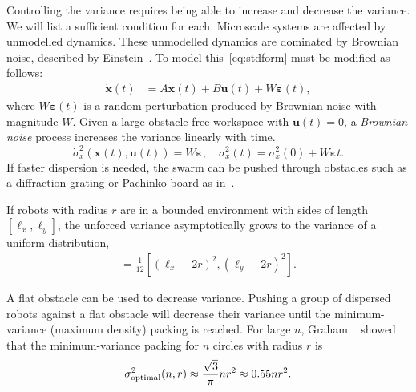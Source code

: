Controlling the variance requires being able to increase and decrease the variance.  We will list a sufficient condition for each. 
Microscale systems are affected by unmodelled dynamics. 
These unmodelled dynamics are dominated by Brownian noise, described by Einstein~\cite{einstein1956investigations}. 
To model this~\eqref{eq:stdform} must be modified as follows:
\begin{align}
\dot{\mathbf{x}}(t)  &=  A \mathbf{x}(t) + B \mathbf{u}(t) + W \bm{\varepsilon}(t),
\end{align}
where $W\bm{\varepsilon}(t)$ is a random perturbation produced by Brownian noise with magnitude $W$. Given a large obstacle-free workspace with $\mathbf{u}(t)= 0$, a \emph{Brownian noise} process increases the variance linearly with time.
\begin{equation}
\dot{\sigma}_x^2(\mathbf{x}(t), \mathbf{u}(t))  = W \bm{\varepsilon},
\quad \sigma_x^2(t)  = \sigma_x^2(0) + W \bm{\varepsilon} t.
\end{equation}
 If faster dispersion is needed, the swarm can be pushed through obstacles such as a diffraction grating or Pachinko board as in~\cite{Becker2013b}. 

If robots with radius $r$ are in a bounded environment with sides of length $[\ell_x, \ell_y]$, the unforced variance asymptotically grows to the variance of a uniform distribution,
\begin{align}
[\sigma_x^2,\sigma_y^2] = \frac{1}{12}[ (\ell_x - 2 r)^2,(\ell_y - 2 r)^2].\label{eq:VarianceUniformDistribution}
\end{align}

 A flat obstacle can be used to decrease variance. Pushing a group of dispersed robots against a flat obstacle will decrease their variance until the minimum-variance (maximum density) packing  is reached. For large $n$, Graham ~\cite{graham1990penny} showed that the minimum-variance packing  for $n$ circles with radius $r$ is 
 \begin{align} \label{eq:optimalvar}
 \sigma^2_{\rm{optimal}}(n,r) \approx   \frac{\sqrt{3}}{\pi} n r^2\approx 0.55 n r^2.
 \end{align} 

